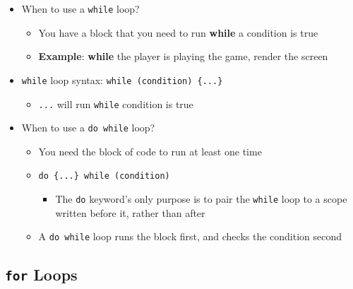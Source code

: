 \documentclass{article}
\begin{document}
\begin{itemize}
	\item When to use a \texttt{while} loop?
	\begin{itemize}
		\item You have a block that you need to run \textbf{while} a condition is true
		\item \textbf{Example}: \textbf{while} the player is playing the game, render the screen
	\end{itemize}
	\item \texttt{while} loop syntax: \texttt{while (condition) \{...\}}
	\begin{itemize}
		\item \texttt{...} will run \texttt{while} condition is true
	\end{itemize}
	\item When to use a \texttt{do while} loop?
	\begin{itemize}
		\item You need the block of code to run at least one time
		\item \texttt{do \{...\} while (condition)}
		\begin{itemize}\item The \texttt{do} keyword's only purpose is to pair the \texttt{while} loop to a scope written before it, rather than after
		\end{itemize}
		\item A \texttt{do while} loop runs the block first, and checks the condition second
	\end{itemize}
\end{itemize}

\subsection{\texttt{for} Loops}
\end{document}
